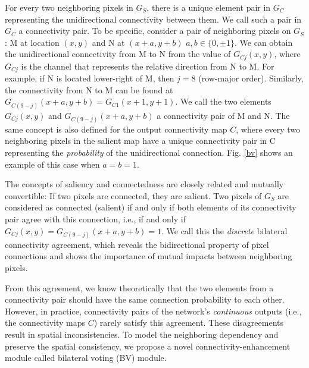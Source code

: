 \documentclass[final]{cvpr}
\begin{document}
For every two neighboring pixels in $G_S$, there is a unique element pair in $G_C$ representing the unidirectional connectivity between them. We call such a pair in $G_C$ a connectivity pair. To be specific, consider a pair of neighboring pixels on $G_S$: M at location $(x,y)$ and N at $(x+a,y+b)$ $a,b \in \{ 0,\pm 1\}$. We can obtain the unidirectional connectivity from M to N from the value of $G_{Cj} (x,y)$, where  $G_{Cj}$ is the channel that represents the relative direction from N to M. For example, if N is located lower-right of M, then $j = 8$ (row-major order). Similarly, the connectivity from N to M can be found at $G_{C(9-j)}(x+a,y+b)=G_{C1}(x+1,y+1)$. We call the two elements $G_{Cj} (x,y)$ and $G_{C(9-j)}(x+a,y+b)$ a connectivity pair of M and N. The same concept is also defined for the output connectivity map $C$, where every two neighboring pixels in the salient map have a unique connectivity pair in C representing the  \textit{probability} of the unidirectional connection. Fig. \ref{bv} shows an example of this case when $a=b=1$.

The concepts of saliency and connectedness are closely related and mutually convertible: If two pixels are connected, they are salient. Two pixels of $G_S$ are considered as connected (salient) if and only if both elements of its connectivity pair agree with this connection, i.e., if and only if $G_{Cj}(x,y)=G_{C(9-j)}(x+a,y+b)=1$.
We call this the \textit{discrete} bilateral connectivity agreement, which reveals the bidirectional property of pixel connections and shows the importance of mutual impacts between neighboring pixels.

From this agreement, we know theoretically that the two elements from a connectivity pair should have the same connection probability to each other. However, in practice, connectivity pairs of the network’s \textit{continuous} outputs (i.e., the connectivity maps $C$) rarely satisfy this agreement. These disagreements result in spatial inconsistencies. To model the neighboring dependency and preserve the spatial consistency, we propose a novel connectivity-enhancement module called bilateral voting (BV) module.
\end{document}
